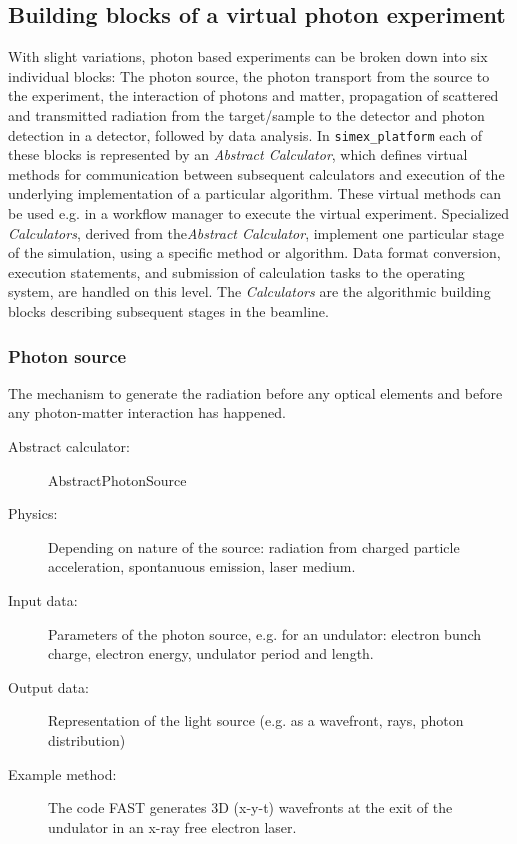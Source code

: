\documentclass[a4paper]{article}
\begin{document}
\subsection{Building blocks of a virtual photon experiment}
With slight variations, photon based experiments can be broken down into six individual blocks: The photon source, the photon transport
from the source to the experiment, the interaction of photons and matter, propagation of scattered and transmitted radiation from the
target/sample to the detector and photon detection in a detector, followed by data analysis.
In \texttt{simex\_platform} each of these blocks is
represented by an \textit{Abstract Calculator}, which defines virtual methods for communication between subsequent calculators and execution of
the underlying implementation of a particular algorithm.
These virtual methods can be used e.g. in a workflow manager to execute the virtual experiment.
Specialized \textit{Calculators}, derived from the\textit{Abstract Calculator}, implement one particular stage of the simulation, using a
specific method or algorithm. Data
format conversion, execution statements, and submission of calculation tasks to the operating system, are handled on this
level. The
\textit{Calculators} are the algorithmic building blocks describing subsequent stages in the beamline.
%
\subsubsection{Photon source}
The mechanism to generate the radiation before any optical elements and before any photon-matter interaction has happened.
\begin{description}
  \item[Abstract calculator:] AbstractPhotonSource
  \item[Physics:] Depending on nature of the source: radiation from charged particle acceleration, spontanuous emission, laser medium.
  \item[Input data:] Parameters of the photon source, e.g. for an undulator: electron bunch charge, electron energy, undulator period and length.
  \item[Output data:] Representation of the light source (e.g. as a wavefront, rays, photon distribution)
  \item[Example method:] The code FAST \cite{Saldin1999} generates 3D (x-y-t) wavefronts at the exit of the undulator in an x-ray free electron laser.
\end{description}
%
\end{document}
